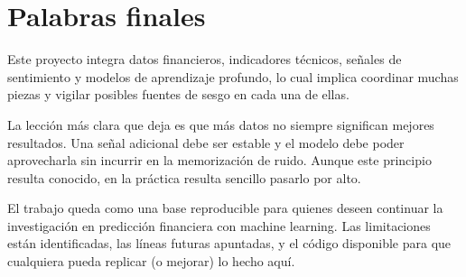 \section{Palabras finales}

Este proyecto integra datos financieros, indicadores técnicos, señales de sentimiento y modelos de aprendizaje profundo, lo cual implica coordinar muchas piezas y vigilar posibles fuentes de sesgo en cada una de ellas.

La lección más clara que deja es que más datos no siempre significan mejores resultados. Una señal adicional debe ser estable y el modelo debe poder aprovecharla sin incurrir en la memorización de ruido. Aunque este principio resulta conocido, en la práctica resulta sencillo pasarlo por alto.

El trabajo queda como una base reproducible para quienes deseen continuar la investigación en predicción financiera con machine learning. Las limitaciones están identificadas, las líneas futuras apuntadas, y el código disponible para que cualquiera pueda replicar (o mejorar) lo hecho aquí.
